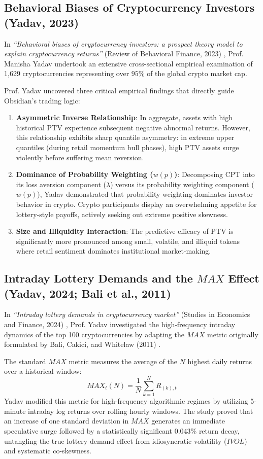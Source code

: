\documentclass[10pt,journal,compsoc]{IEEEtran}
\begin{document}
\subsection{Behavioral Biases of Cryptocurrency Investors (Yadav, 2023)}
In \textit{``Behavioral biases of cryptocurrency investors: a prospect theory model to explain cryptocurrency returns''} (Review of Behavioral Finance, 2023) \cite{yadav2023behavioral}, Prof. Manisha Yadav undertook an extensive cross-sectional empirical examination of 1,629 cryptocurrencies representing over $95\%$ of the global crypto market cap. 

Prof. Yadav uncovered three critical empirical findings that directly guide Obsidian's trading logic:
\begin{enumerate}
    \item \textbf{Asymmetric Inverse Relationship}: In aggregate, assets with high historical PTV experience subsequent negative abnormal returns. However, this relationship exhibits sharp quantile asymmetry: in extreme upper quantiles (during retail momentum bull phases), high PTV assets surge violently before suffering mean reversion.
    \item \textbf{Dominance of Probability Weighting ($w(p)$)}: Decomposing CPT into its loss aversion component ($\lambda$) versus its probability weighting component ($w(p)$), Yadav demonstrated that probability weighting dominates investor behavior in crypto. Crypto participants display an overwhelming appetite for lottery-style payoffs, actively seeking out extreme positive skewness.
    \item \textbf{Size and Illiquidity Interaction}: The predictive efficacy of PTV is significantly more pronounced among small, volatile, and illiquid tokens where retail sentiment dominates institutional market-making.
\end{enumerate}

\subsection{Intraday Lottery Demands and the $MAX$ Effect (Yadav, 2024; Bali et al., 2011)}
In \textit{``Intraday lottery demands in cryptocurrency market''} (Studies in Economics and Finance, 2024) \cite{yadav2024intraday}, Prof. Yadav investigated the high-frequency intraday dynamics of the top 100 cryptocurrencies by adapting the $MAX$ metric originally formulated by Bali, Cakici, and Whitelaw (2011) \cite{bali2011maxing}. 

The standard $MAX$ metric measures the average of the $N$ highest daily returns over a historical window:
\begin{equation}
MAX_t(N) = \frac{1}{N} \sum_{k=1}^N R_{(k), t}
\end{equation}
Yadav modified this metric for high-frequency algorithmic regimes by utilizing 5-minute intraday log returns over rolling hourly windows. The study proved that an increase of one standard deviation in $MAX$ generates an immediate speculative surge followed by a statistically significant $0.043\%$ return decay, untangling the true lottery demand effect from idiosyncratic volatility ($IVOL$) and systematic co-skewness.
\end{document}
